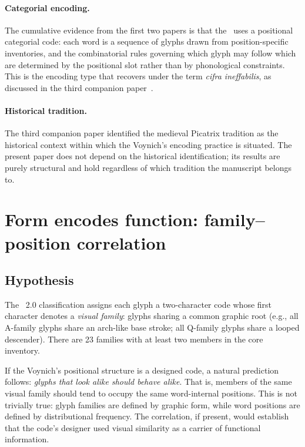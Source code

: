 \paragraph{Categorial encoding.}
The cumulative evidence from the first two papers is that the \vms\
uses a positional categorial code: each word is a sequence of glyphs
drawn from position-specific inventories, and the combinatorial rules
governing which glyph may follow which are determined by the positional
slot rather than by phonological constraints. This is the encoding type
that \citet{martinezgavilan2025} recovers under the term \textit{cifra
ineffabilis}, as discussed in the third companion
paper~\citep{jimenez2026venusring}.

\paragraph{Historical tradition.}
The third companion paper identified the medieval Picatrix tradition as
the historical context within which the Voynich's encoding practice
is situated. The present paper does not depend on the historical
identification; its results are purely structural and hold regardless
of which tradition the manuscript belongs to.


\section{Form encodes function: family--position correlation}
\label{sec:family_position}

\subsection{Hypothesis}

The \sta\ 2.0 classification assigns each glyph a two-character code
whose first character denotes a \emph{visual family}: glyphs sharing
a common graphic root (e.g., all A-family glyphs share an arch-like
base stroke; all Q-family glyphs share a looped descender). There are
23 families with at least two members in the core inventory.

If the Voynich's positional structure is a designed code, a natural
prediction follows: \emph{glyphs that look alike should behave alike}.
That is, members of the same visual family should tend to occupy the
same word-internal positions. This is not trivially true: glyph
families are defined by graphic form, while word positions are defined
by distributional frequency. The correlation, if present, would
establish that the code's designer used visual similarity as a carrier
of functional information.

